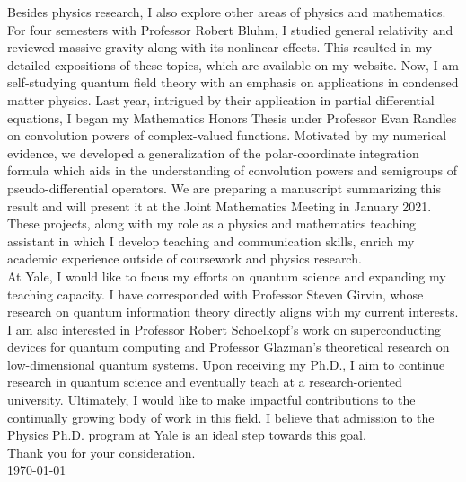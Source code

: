 \documentclass[12pt]{article}
\begin{document}
Besides physics research, I also explore other areas of physics and mathematics. For four semesters with Professor Robert Bluhm, I studied general relativity and reviewed massive gravity along with its nonlinear effects. This resulted in my detailed expositions of these topics, which are available on my website. Now, I am self-studying quantum field theory with an emphasis on applications in condensed matter physics. Last year, intrigued by their application in partial differential equations, I began my Mathematics Honors Thesis under Professor Evan Randles on convolution powers of complex-valued functions. Motivated by my numerical evidence, we developed a generalization of the polar-coordinate integration formula which aids in the understanding of convolution powers and semigroups of pseudo-differential operators. We are preparing a manuscript summarizing this result and will present it at the Joint Mathematics Meeting in January 2021. These projects, along with my role as a physics and mathematics teaching assistant in which I develop teaching and communication skills, enrich my academic experience outside of coursework and physics research.  \\ 

At Yale, I would like to focus my efforts on quantum science and expanding my teaching capacity. I have corresponded with Professor Steven Girvin, whose research on quantum information theory directly aligns with my current interests. I am also interested in Professor Robert Schoelkopf's work on superconducting devices for quantum computing and Professor Glazman's theoretical research on low-dimensional quantum systems. Upon receiving my Ph.D., I aim to continue research in quantum science and eventually teach at a research-oriented university. Ultimately, I would like to make impactful contributions to the continually growing body of work in this field. I believe that admission to the Physics Ph.D. program at Yale is an ideal step towards this goal. \\

\noindent Thank you for your consideration. \\

\noindent \today


	
	
	
\end{document}
